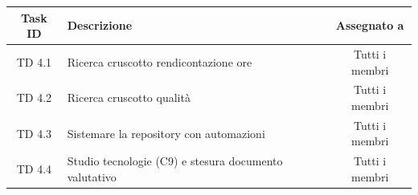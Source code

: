 \documentclass[a4paper, 11pt]{article}
\begin{document}
\vspace{1cm}

\noindent
\begin{tabularx}{\textwidth}{|c|X|c|}
    \hline
    \textbf{Task ID} & \textbf{Descrizione} & \textbf{Assegnato a} \\ \hline
    TD 4.1 & Ricerca cruscotto rendicontazione ore & Tutti i membri \\ \hline
    TD 4.2 & Ricerca cruscotto qualità & Tutti i membri \\ \hline
    TD 4.3 & Sistemare la repository con automazioni & Tutti i membri \\ \hline
    TD 4.4 & Studio tecnologie (C9) e stesura documento valutativo & Tutti i membri \\ \hline
\end{tabularx}
\end{document}

